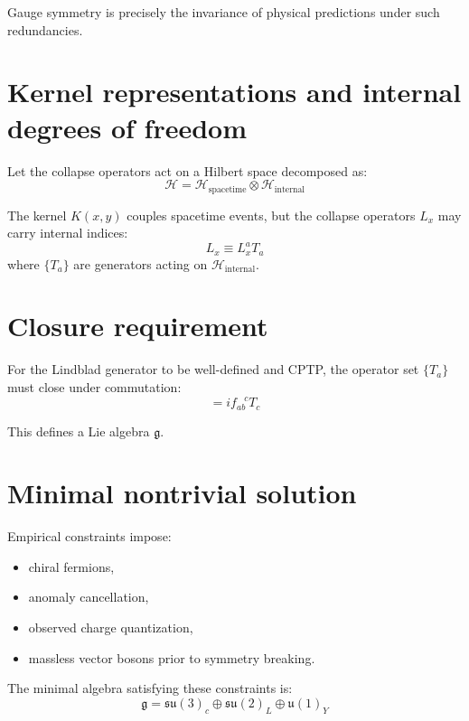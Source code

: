 \documentclass[11pt]{book}
\begin{document}
Gauge symmetry is precisely the invariance of physical predictions under
such redundancies.

\section{Kernel representations and internal degrees of freedom}

Let the collapse operators act on a Hilbert space decomposed as:
\begin{equation}
\mathcal{H}
=
\mathcal{H}_{\text{spacetime}}
\otimes
\mathcal{H}_{\text{internal}}
\end{equation}

The kernel $K(x,y)$ couples spacetime events, but the collapse operators
$L_x$ may carry internal indices:
\begin{equation}
L_x \equiv L_x^a T_a
\end{equation}
where $\{T_a\}$ are generators acting on $\mathcal{H}_{\text{internal}}$.

\section{Closure requirement}

For the Lindblad generator to be well-defined and CPTP, the operator set
$\{T_a\}$ must close under commutation:
\begin{equation}
[T_a, T_b] = i f_{ab}^{\;\;\;c} T_c
\end{equation}

This defines a Lie algebra $\mathfrak{g}$.

\section{Minimal nontrivial solution}

Empirical constraints impose:

\begin{itemize}
\item chiral fermions,
\item anomaly cancellation,
\item observed charge quantization,
\item massless vector bosons prior to symmetry breaking.
\end{itemize}

The minimal algebra satisfying these constraints is:
\begin{equation}
\mathfrak{g}
=
\mathfrak{su}(3)_c
\oplus
\mathfrak{su}(2)_L
\oplus
\mathfrak{u}(1)_Y
\end{equation}
\end{document}
